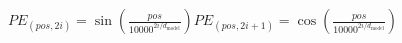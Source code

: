 \documentclass[preview]{standalone}
\begin{document}
\begin{align*}
PE_{(pos, 2i)} = \sin\left(\frac{pos}{10000^{2i/d_{\text{model}}}}\right) PE_{(pos, 2i+1)} = \cos\left(\frac{pos}{10000^{2i/d_{\text{model}}}}\right)
\end{align*}
\end{document}
